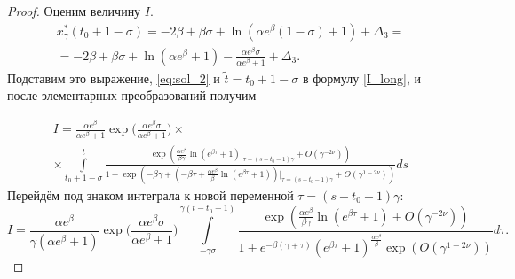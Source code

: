 \begin{proof}
Оценим величину $I$.
%
\begin{multline*}
x_\gamma^*(t_0 + 1 - \sigma) = -2\beta + \beta \sigma + \ln(\alpha e^{\beta}(1 - \sigma) + 1) + \Delta_3 =\\
= -2 \beta + \beta \sigma + \ln(\alpha e^{\beta} + 1) - \frac{\alpha e^{\beta}\sigma}{\alpha e^\beta + 1} +\Delta_3.
\end{multline*}
%
Подставим это выражение, \eqref{eq:sol_2} и $\tilde{t} = t_0 + 1 - \sigma$ в формулу \eqref{I_long}, и после элементарных преобразований получим
\begin{comment}
\[
I = \int\limits_{\tilde{t}}^{t}\frac{\alpha\exp(x_\gamma^*(s-1)+\beta(s-\tilde{t})-x_\gamma^*(\tilde{t}))}{1+\exp(\gamma x_\gamma^*(s-1))}ds = 
\]
\[
= \int\limits_{t_0+1-\sigma}^{t}\frac{\alpha\exp(-\beta+\frac1\gamma w_0|_{\tau=(t-t_0-1)\gamma}+\Delta_2+\beta(s-t_0-1+\sigma)-x^*_\gamma(t_0+1-\sigma))}{1+\exp(-\beta\gamma+ w_0|_{\tau=(t-t_0-1)\gamma}+\gamma\Delta_2)}ds=
\]
\[
= \int\limits_{t_0+1-\sigma}^{t}\frac{\alpha\exp(-\beta+\frac1\gamma (-\beta \tau+\frac{\alpha e^\beta}{\beta}\ln(e^{\beta\tau}+1))|_{\tau=(t-t_0-1)\gamma}+\Delta_2+\frac1\gamma\beta\tau+\beta\sigma-x^*_\gamma(t_0+1-\sigma))}{1+\exp(-\beta\gamma+ (-\beta \tau+\frac{\alpha e^\beta}{\beta}\ln(e^{\beta\tau}+1))|_{\tau=(t-t_0-1)\gamma}+\gamma\Delta_2)}ds=
\]
\[
= \int\limits_{t_0+1-\sigma}^{t}\frac{\alpha\exp(-\beta+ \frac{\alpha e^\beta}{\beta\gamma}\ln(e^{\beta\tau}+1)|_{\tau=(t-t_0-1)\gamma}+\Delta_2+\beta\sigma-(-2\beta+\beta\sigma+\ln(\alpha e^{\beta}+1)-\frac{\alpha e^{\beta}\sigma}{\alpha e^\beta+1} +\Delta_3))}{1+\exp(-\beta\gamma+ (-\beta \tau+\frac{\alpha e^\beta}{\beta}\ln(e^{\beta\tau}+1))|_{\tau=(t-t_0-1)\gamma}+\gamma\Delta_2)}ds=
\]
\end{comment}
\begin{multline*}
I = \frac{\alpha e^\beta}{\alpha e^{\beta}+1}\exp\Big(\frac{\alpha e^{\beta}\sigma}{\alpha e^\beta+1}\Big) \times
\\
\times\int\limits_{t_0+1-\sigma}^{t}\frac{\exp( \frac{\alpha e^\beta}{\beta\gamma}\ln(e^{\beta\tau}+1)|_{\tau=(s-t_0-1)\gamma} +O(\gamma^{-2\nu}))}{1+\exp(-\beta\gamma+ (-\beta \tau+\frac{\alpha e^\beta}{\beta}\ln(e^{\beta\tau}+1))|_{\tau=(s-t_0-1)\gamma}+O(\gamma^{1 - 2\nu}))}ds
\end{multline*}
%
Перейдём под знаком интеграла к новой переменной $\tau=(s-t_0-1)\gamma$:
\small
\begin{equation}
	\label{eq:I_step4}
	I = \frac{\alpha e^\beta}{\gamma(\alpha e^{\beta}+1)}\exp\Big(\frac{\alpha e^{\beta}\sigma}{\alpha e^\beta+1}\Big)
	\int\limits_{-\gamma \sigma}^{\gamma (t - t_0 - 1)}\frac{\exp( \frac{\alpha e^\beta}{\beta\gamma}\ln(e^{\beta\tau} + 1) +O(\gamma^{-2\nu}))}{1 + e^{-\beta(\gamma+\tau)}(e^{\beta\tau} + 1)^\frac{\alpha e^\beta}{\beta}\exp(O(\gamma^{1-2\nu}))} d\tau.
\end{equation}
\normalsize


\end{proof}
